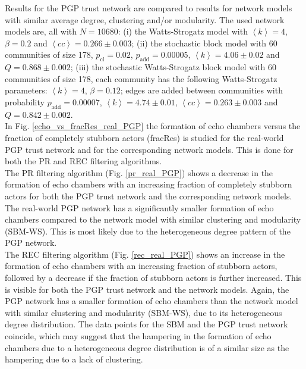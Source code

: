 \documentclass[11 pt , letterpaper , twoside , openright]{book}
\begin{document}
Results for the PGP trust network are compared to results for network models with similar average degree, clustering and/or modularity. The used network models are, all with $N = 10680$: (i) the Watts-Strogatz model with $\left<k\right> = 4$, $\beta = 0.2$ and $\left<cc\right> = 0.266 \pm 0.003$; (ii) the stochastic block model with 60 communities of size 178, $p_\text{cl} = 0.02$, $p_\text{add} = 0.00005$, $\left<k\right> = 4.06 \pm 0.02$ and $Q = 0.868 \pm 0.002$; (iii) the stochastic Watts-Strogatz block model with 60 communities of size 178, each community has the following Watts-Strogatz parameters: $\left<k\right> = 4$, $\beta = 0.12$; edges are added between communities with probability $p_\text{add} = 0.00007$, $\left<k\right> = 4.74 \pm 0.01$, $\left<cc\right> = 0.263 \pm 0.003$ and $Q = 0.842 \pm 0.002$.\\
\newline
In Fig. \ref{echo_vs_fracRes_real_PGP} the formation of echo chambers versus the fraction of completely stubborn actors (fracRes) is studied for the real-world PGP trust network and for the corresponding network models. This is done for both the PR and REC filtering algorithms. \\
\newline
The PR filtering algorithm (Fig. \ref{pr_real_PGP}) shows a decrease in the formation of echo chambers with an increasing fraction of completely stubborn actors for both the PGP trust network and the corresponding network models. The real-world PGP network has a significantly smaller formation of echo chambers compared to the network model with similar clustering and modularity (SBM-WS). This is most likely due to the heterogeneous degree pattern of the PGP network. \\
The REC filtering algorithm (Fig. \ref{rec_real_PGP}) shows an increase in the formation of echo chambers with an increasing fraction of stubborn actors, followed by a decrease if the fraction of stubborn actors is further increased. This is visible for both the PGP trust network and the network models. Again, the PGP network has a smaller formation of echo chambers than the network model with similar clustering and modularity (SBM-WS), due to its heterogeneous degree distribution. The data points for the SBM and the PGP trust network coincide, which may suggest that the hampering in the formation of echo chambers due to a heterogeneous degree distribution is of a similar size as the hampering due to a lack of clustering.
\end{document}
